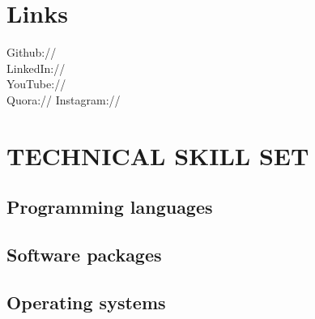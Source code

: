 \documentclass[]{deedy-resume-openfont}
\begin{document}
\begin{minipage}[t]{0.33\textwidth}
\section{Links} 
Github:// \href{https://github.com/InnovativeCoder}{} \\
LinkedIn://  \href{https://www.linkedin.com/in/jasneet-singh-sawhney-707944110/}{} \\
YouTube://  \href{https://www.youtube.com/channel/UCKQOUcqLLQXWLKUAQbfKiNQ}{} \\
Quora://  \href{https://www.quora.com/profile/Jasneet-Singh-Sawhney}{}
Instagram:// \href{https://www.instagram.com/innovative_coder/}{}
\sectionsep
\sectionsep
\vspace{8mm}
\section{TECHNICAL SKILL SET}

\subsection{Programming languages}
\sectionsep

\subsection{Software packages}
\sectionsep

\subsection{Operating systems}





\setlength{\columnsep}{1in}


%
%

\end{minipage} 
\hfill
\end{document}
